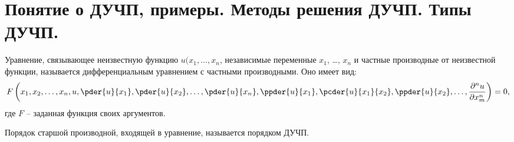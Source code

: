 \chapter{Понятие о ДУЧП, примеры. Методы решения ДУЧП. Типы ДУЧП.}

Уравнение, связывающее неизвестную функцию \( u(x_1, \ldots, x_n \), независимые
переменные \( x_1 \), \ldots, \( x_n \) и частные производные от неизвестной
функции, называется дифференциальным уравнением с частными производными. Оно
имеет вид:
\[
    F\left(x_1, x_2, \ldots, x_n, u, \pder{u}{x_1}, \pder{u}{x_2}, \ldots,
    \pder{u}{x_n}, \ppder{u}{x_1}, \pcder{u}{x_1}{x_2}, \ppder{u}{x_2}, \ldots,
    \pnder{n}{u}{x_m}\right) = 0,
\]
где \( F \) -- заданная функция своих аргументов.

Порядок старшой производной, входящей в уравнение, называется порядком ДУЧП.

